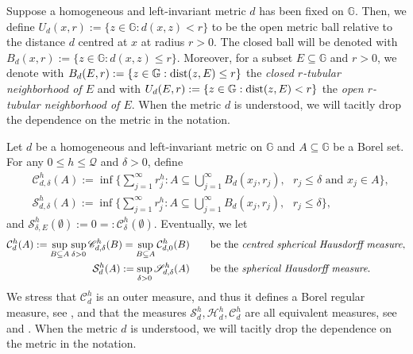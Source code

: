 \documentclass[10pt, a4paper,
oneside, headinclude,footinclude]{scrartcl}
\begin{document}
\begin{definizione}
Suppose a homogeneous and left-invariant metric  $d$ has been fixed on $\mathbb{G}$. Then, we define $U_d(x,r):=\{z\in \mathbb{G}:d(x,z)<r\}$ to be the open metric ball relative to the distance $d$ centred at $x$ at radius $r>0$. The closed ball will be denoted with $B_d(x,r):=\{z\in \mathbb{G}:d(x,z)\leq r\}$. Moreover, for a subset $E\subseteq \mathbb G$ and $r>0$, we denote with $B_d(E,r):=\{z\in\mathbb G:\operatorname*{dist}(z,E)\leq r\}$ the {\em closed $r$-tubular neighborhood of $E$}  and with $U_d(E,r):=\{z\in\mathbb G:\operatorname*{dist}(z,E)< r\}$ the {\em open $r$-tubular neighborhood of $E$}. When the metric $d$ is understood, we will tacitly drop the dependence on the metric in the notation.
\end{definizione}


\begin{definizione}\label{def:HausdorffMEasure}
Let $d$ be a homogeneous and left-invariant metric on $\mathbb{G}$ and $A\subseteq \mathbb{G}$ be a Borel set. For any $0\leq h\leq \mathcal{Q}$ and  $\delta>0$, define
\begin{equation}
\begin{split}
    &\mathscr{C}^{h}_{d,\delta}(A):=\inf\Bigg\{\sum_{j=1}^\infty r_j^h:A\subseteq \bigcup_{j=1}^\infty B_{d}(x_j,r_j),\text{ }r_j\leq\delta\text{ and }x_j\in A\Bigg\},\\
    &\mathscr{S}^{h}_{d,\delta}(A):=\inf\Bigg\{\sum_{j=1}^\infty r_j^h:A\subseteq \bigcup_{j=1}^\infty B_d(x_j,r_j),\text{ }r_j\leq\delta\Bigg\},
    \nonumber
\end{split}    
\end{equation}
and $\mathscr{S}^{h}_{\delta,E}(\emptyset):=0=:\mathscr{C}^{h}_{\delta}(\emptyset)$. Eventually, we let
\begin{equation}
    \begin{split}
  \mathcal{C}^{h}_{d}(A):=\sup_{B\subseteq A}\sup_{\delta>0}\mathscr{C}^{h}_{d,\delta}(B)=\sup_{B\subseteq A}\mathcal{C}_{d,0}^h(B)&\qquad\text{be the {\em centred spherical Hausdorff measure}},\\
   \mathcal{S}^{h}_{d}(A):=\sup_{\delta>0}\mathscr{S}^{h}_{d,\delta}(A)&\qquad\text{be the {\em spherical Hausdorff measure}}.
   \nonumber
    \end{split}
\end{equation}
We stress that $\mathcal{C}^h_{d}$ is an outer measure, and thus it defines a Borel regular measure, see \cite[Proposition 4.1]{EdgarCentered}, and that the measures $\mathcal{S}^h_{d},\mathcal{H}^h_{d},\mathcal{C}^h_{d}$ are all equivalent measures, see \cite[Section 2.10.2]{Federer1996GeometricTheory} and \cite[Proposition 4.2]{EdgarCentered}. When the metric $d$ is understood, we will tacitly drop the dependence on the metric in the notation.
\end{definizione}
\end{document}
